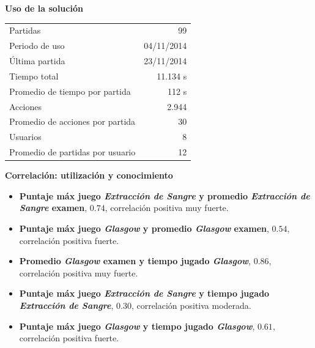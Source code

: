 \documentclass[portrait,final,a0paper,fontscale=0.277]{baposter}
\begin{document}
\begin{poster}
{\begin{multicols}{2}
	
\textbf{Uso de la solución}
\begin{center}
    \scriptsize
\begin{tabular}{lr}
\toprule
Partidas                         & 99 \\
Periodo de uso                 & 04/11/2014 \\
Última partida                   & 23/11/2014 \\
\midrule
Tiempo total       & 11.134 s \\
Promedio de tiempo por partida   & 112 s
\\\midrule
Acciones           & 2.944 \\
Promedio de acciones por partida & 30
\\\midrule
Usuarios           & 8 \\
Promedio de partidas por usuario & 12
\\\bottomrule
\end{tabular}                                                      
\end{center}

\textbf{Correlación: utilización y conocimiento}
	\begin{center}
	
	\scriptsize 
	\begin{itemize}
		\item \textbf{Puntaje máx juego \textit{Extracción de Sangre} y promedio 
		\textit{Extracción de Sangre} examen}, $0.74$, 
		correlación positiva muy fuerte.
		\item \textbf{Puntaje máx juego \textit{Glasgow} y promedio 
		\textit{Glasgow} examen}, $0.54$, correlación positiva 
		fuerte.
		\item \textbf{Promedio \textit{Glasgow} examen y tiempo jugado 
		\textit{Glasgow}}, $0.86$, correlación positiva muy fuerte.
		\item \textbf{Puntaje máx juego \textit{Extracción de Sangre} y tiempo 
		jugado \textit{Extracción de Sangre}}, $0.30$, correlación positiva 
		moderada.
		\item \textbf{Puntaje máx juego \textit{Glasgow} y tiempo jugado 
		\textit{Glasgow}}, $0.61$, correlación positiva fuerte. 
	\end{itemize}
		
	\end{center}


\end{multicols}}
\end{poster}
\end{document}
